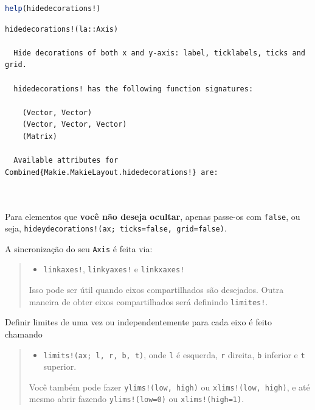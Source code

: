 \documentclass[
  notoc %
]{tufte-book}
\providecommand{\tightlist}{%
  \setlength{\itemsep}{0pt}\setlength{\parskip}{0pt}
}
\newcommand{\passthrough}[1]{#1}
\begin{document}
\begin{lstlisting}[language=Julia]
help(hidedecorations!)
\end{lstlisting}

\begin{lstlisting}[language=Output]
  hidedecorations!(la::Axis)

  Hide decorations of both x and y-axis: label, ticklabels, ticks and grid.

  hidedecorations! has the following function signatures:

    (Vector, Vector)
    (Vector, Vector, Vector)
    (Matrix)

  Available attributes for Combined{Makie.MakieLayout.hidedecorations!} are:

  
\end{lstlisting}

Para elementos que \textbf{você não deseja ocultar}, apenas passe-os com
\passthrough{\lstinline!false!}, ou seja,
\passthrough{\lstinline"hideydecorations!(ax; ticks=false, grid=false)"}.

A sincronização do seu \passthrough{\lstinline!Axis!} é feita via:

\begin{quote}
\begin{itemize}
\tightlist
\item
  \passthrough{\lstinline"linkaxes!"},
  \passthrough{\lstinline"linkyaxes!"} e
  \passthrough{\lstinline"linkxaxes!"}
\end{itemize}

Isso pode ser útil quando eixos compartilhados são desejados. Outra
maneira de obter eixos compartilhados será definindo
\passthrough{\lstinline"limites!"}.
\end{quote}

Definir limites de uma vez ou independentemente para cada eixo é feito
chamando

\begin{quote}
\begin{itemize}
\tightlist
\item
  \passthrough{\lstinline"limits!(ax; l, r, b, t)"}, onde
  \passthrough{\lstinline!l!} é esquerda, \passthrough{\lstinline!r!}
  direita, \passthrough{\lstinline!b!} inferior e
  \passthrough{\lstinline!t!} superior.
\end{itemize}

Você também pode fazer \passthrough{\lstinline"ylims!(low, high)"} ou
\passthrough{\lstinline"xlims!(low, high)"}, e até mesmo abrir fazendo
\passthrough{\lstinline"ylims!(low=0)"} ou
\passthrough{\lstinline"xlims!(high=1)"}.
\end{quote}
\end{document}
